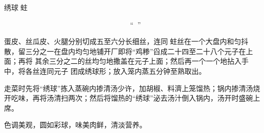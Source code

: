 \begin{recipe}{绣球𧎼蛀}

\ingredients


\preparation

\step 𧎼蛀抠去玉带，淘洗干净，掺清水上笼蒸𤆵，取出挤干水晾冷，搓散成丝；鸡脯、
肥膘分别砸茸；鸡蛋清调匀，加清水、豆粉、味精、盐搅成“鸡糁”；用鸡蛋一个摊成蛋
皮。

\step 蛋皮、丝瓜皮、火腿分别切成五至六分长细丝，连同𧎼蛀丝在一个大盘内和匀抖
散，留三分之一在盘内均匀地铺开厂即将“鸡糁”舀成二十四至二十八个元子在上面；再将
其余三分之二的丝均匀地撒盖在元子上面；然后再一个一个地拈入手中，将各丝连同元子
团成绣球形；放入笼内蒸五分钟至熟取出。

\step 走菜时先将“绣球”拣入蒸碗内掺清汤少许，加胡椒、料濟上笼馏热；锅内掺清汤烧
开吃味，再将汤清扫两次；然后将馏热的“绣球”泌去汤汁倒入锅内，汤开时盛碗上席。

\features

色调美观，圆如彩球，味美肉鲜，清淡营养。

\end{recipe}

